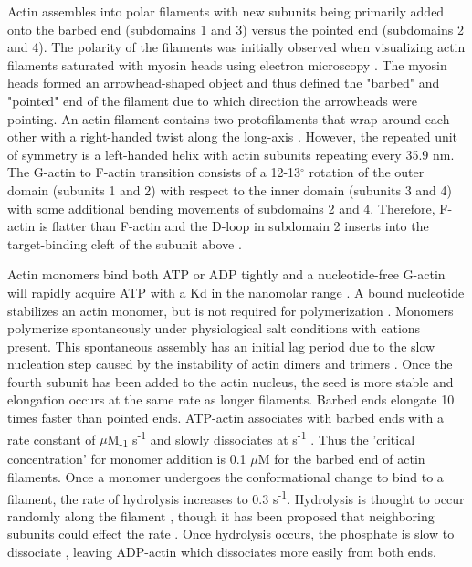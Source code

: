 Actin assembles into polar filaments with new subunits being primarily added onto the barbed end (subdomains 1 and 3) versus the pointed end (subdomains 2 and 4). The polarity of the filaments was initially observed when visualizing actin filaments saturated with myosin heads using electron microscopy \citep{huxley_electron_1963}. The myosin heads formed an arrowhead-shaped object and thus defined the "barbed" and "pointed" end of the filament due to which direction the arrowheads were pointing. An actin filament contains two protofilaments that wrap around each other with a right-handed twist along the long-axis \citep{hanson_structure_1963}. However, the repeated unit of symmetry is a left-handed helix with  actin subunits repeating every 35.9 nm. The G-actin to F-actin transition consists of a 12-13$^\circ$ rotation of the outer domain (subunits 1 and 2) with respect to the inner domain (subunits 3 and 4) with some additional bending movements of subdomains 2 and 4. Therefore, F-actin is flatter than F-actin and the D-loop in subdomain 2 inserts into the target-binding cleft of the subunit above \citep{dominguez_actin_2011}.

Actin monomers bind both ATP or ADP tightly and a nucleotide-free G-actin will rapidly acquire ATP with a Kd in the nanomolar range \citep{de_la_cruz_nucleotide-free_1995}. A bound nucleotide stabilizes an actin monomer, but is not required for polymerization \citep{pollard_actin_2016}. Monomers polymerize spontaneously under physiological salt conditions with cations present. This spontaneous assembly has an initial lag period due to the slow nucleation step caused by the instability of actin dimers and trimers \citep{cooper_kinetic_1983, frieden_polymerization_1983, sept_thermodynamics_2001}. Once the fourth subunit has been added to the actin nucleus, the seed is more stable and elongation occurs at the same rate as longer filaments. Barbed ends elongate 10 times faster than pointed ends. ATP-actin associates with barbed ends with a rate constant of  $\mu$M\textsubscript{-1} s\textsuperscript{-1} and slowly dissociates at  s\textsuperscript{-1} \citep{pollard_rate_1986}. Thus the 'critical concentration' for monomer addition is 0.1 $\mu$M for the barbed end of actin filaments. Once a monomer undergoes the conformational change to bind to a filament, the rate of hydrolysis increases to 0.3 s\textsuperscript{-1}. Hydrolysis is thought to occur randomly along the filament \citep{jeno_internal_1995}, though it has been proposed that neighboring subunits could effect the rate \citep{korn_actin_1987}. Once hydrolysis occurs, the phosphate is slow to dissociate \citep{carlier_direct_1986}, leaving ADP-actin which dissociates more easily from both ends. 

